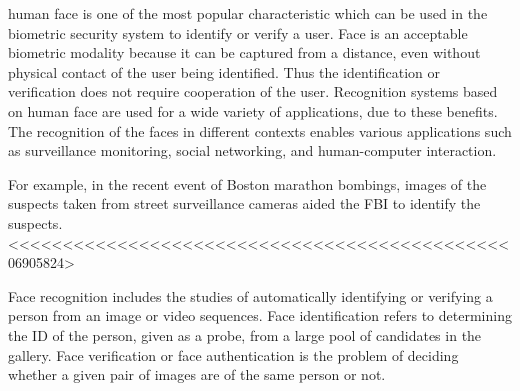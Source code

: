 % 
% 
% 
% 

 human face is one of the most popular
characteristic which can be used in the biometric security system
to identify or verify a user. Face is an acceptable biometric
modality because it can be captured from a distance, even
without physical contact of the user being identified. Thus the
identification or verification does not require cooperation of the
user. Recognition systems based on human face are used for a
wide variety of applications, due to these benefits.\cite{Eurocon}
The recognition of the faces in different contexts
enables various applications such as surveillance monitoring,
social networking, and human-computer interaction.\cite{Forensics}


For example, in the recent event of Boston marathon bombings,
images of the suspects taken from street surveillance cameras
aided the FBI to identify the suspects.
<<<<<<<<<<<<<<<<<<<<<<<<<<<<<<<<<<<<<<<<<<<<<<06905824>


Face recognition includes the studies of automatically
identifying or verifying a person from an image or video
sequences. Face identification refers to determining the ID of
the person, given as a probe, from a large pool of candidates
in the gallery. Face verification or face authentication is the problem of deciding whether a given pair of images are
of the same person or not\cite{Forensics}.

